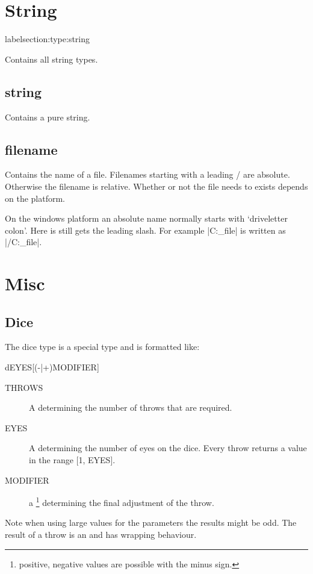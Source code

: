 \section{String}
label{section:type:string}

Contains all string types.


\subsection{string}
\label{type:string}

Contains a pure string.


\subsection{filename}
\label{type:filename}

Contains the name of a file. Filenames starting with a leading / are
absolute. Otherwise the filename is relative. Whether or not the file needs
to exists depends on the platform.

On the windows platform an absolute name normally starts with `driveletter
colon'. Here is still gets the leading slash. For example
\command|C:\my_file| is written as \command|/C:\my_file|.

\section{Misc}



\subsection{Dice}
\label{type:dice}

The dice type is a special type and is formatted like:

\indent [THROWS]dEYES[(-|+)MODIFIER]

\begin{description}
\item[THROWS]
	A  determining the number of throws that are required.

\item[EYES]
	A  determining the number of eyes on the dice. Every throw
	returns a value in the range [1, EYES].

\item[MODIFIER]
	a \footnote{positive, negative values are possible with the
	minus sign.} determining the final adjustment of the throw.

\end{description}

Note when using large values for the parameters the results might be odd.
The result of a throw is an  and has wrapping behaviour.


